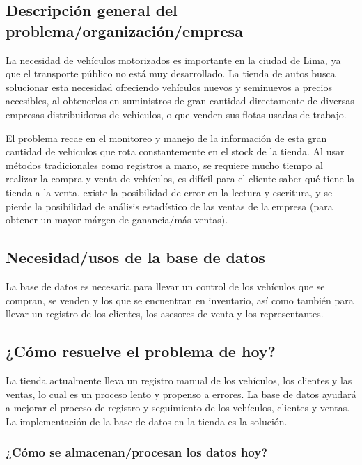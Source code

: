 \documentclass[12pt]{article}
\begin{document}
\subsection{Descripci\'on general del problema/organizaci\'on/empresa}

La necesidad de vehículos motorizados es importante en la ciudad de Lima, ya que el transporte público no está muy desarrollado. La tienda de autos busca solucionar esta necesidad ofreciendo vehículos nuevos y seminuevos a precios accesibles, al obtenerlos en suministros de gran cantidad directamente de diversas empresas distribuidoras de vehiculos, o que venden sus flotas usadas de trabajo.

El problema recae en el monitoreo y manejo de la información de esta gran cantidad de vehiculos que rota constantemente en el stock de la tienda. Al usar métodos tradicionales como registros a mano, se requiere mucho tiempo al realizar la compra y venta de vehículos, es difícil para el cliente saber qué tiene la tienda a la venta, existe la posibilidad de error en la lectura y escritura, y se pierde la posibilidad de análisis estadístico de las ventas de la empresa (para obtener un mayor márgen de ganancia/más ventas).

\subsection{Necesidad/usos de la base de datos}

La base de datos es necesaria para llevar un control de los vehículos que se compran, se venden y los que se encuentran en inventario, así como también para llevar un registro de los clientes, los asesores de venta y los representantes.

\subsection{¿Cómo resuelve el problema de hoy?}

La tienda actualmente lleva un registro manual de los vehículos, los clientes y las ventas, lo cual es un proceso lento y propenso a errores. La base de datos ayudará a mejorar el proceso de registro y seguimiento de los vehículos, clientes y ventas. La implementación de la base de datos en la tienda es la solución.

\subsubsection{¿Cómo se almacenan/procesan los datos hoy?}
\end{document}
